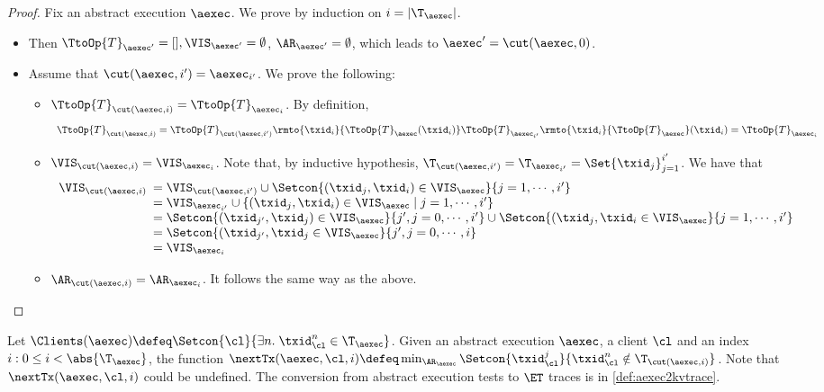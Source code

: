 \begin{proof}
Fix an abstract execution $\aexec$. We prove by induction on $i = \lvert \T_{\aexec} \rvert$.
\begin{itemize}
\item {} Then $\TtoOp{T}_{\aexec'} = [], \VIS_{\aexec'} = \emptyset$, 
$\AR_{\aexec'} = \emptyset$, which leads to $\aexec' = \cut(\aexec, 0)$. 
\item {} 
Assume that $\cut(\aexec, i') = \aexec_{i'}$. 
We prove the following: 
\begin{itemize}
\item $\TtoOp{T}_{\cut(\aexec, i)} = \TtoOp{T}_{\aexec_i}$. 
By definition, 
\[
    \begin{array}{l}
\TtoOp{T}_{\cut(\aexec,i)} = \TtoOp{T}_{\cut(\aexec, i')}\rmto{\txid_{i}}{\TtoOp{T}_{\aexec}(\txid_{i})} 
\TtoOp{T}_{\aexec_{i'}}\rmto{\txid_{i}}{\TtoOp{T}_{\aexec}}(\txid_{i}) = \TtoOp{T}_{\aexec_{i}}
\end{array}
\]
\item $\VIS_{\cut(\aexec, i)} = \VIS_{\aexec_{i}}$. 
Note that, by inductive hypothesis, $\T_{\cut(\aexec, i')} = \T_{\aexec_{i'}} = \Set{\txid_{j}}_{j=1}^{i'}$. 
We have that  
\[
\begin{array}{l}
    \VIS_{\cut(\aexec, i)}
    \begin{array}[t]{l}
    = \VIS_{\cut(\aexec, i')} \cup \Setcon{(\txid_j, \txid_{i}) \in \VIS_{\aexec} }{ j = 1,\cdots, i'} \\ 
    = \VIS_{\aexec_{i'}} \cup \{(\txid_{j}, \txid_{i}) \in \VIS_{\aexec} \mid j=1,\cdots, i'\} \\ 
    = \Setcon{(\txid_{j'}, \txid_{j}) \in \VIS_{\aexec} }{ j', j = 0,\cdots, i'} \cup \Setcon{(\txid_{j}, \txid_{i} \in \VIS_{\aexec} }{ j=1,\cdots, i'} \\
    = \Setcon{(\txid_{j'}, \txid_{j} \in \VIS_{\aexec}  }{ j',j = 0,\cdots, i} \\
    = \VIS_{\aexec_{i}}
    \end{array}
\end{array}
\]
\item $\AR_{\cut(\aexec, i)} = \AR_{\aexec_{i}}$. It follows the same way 
as the above. 
\end{itemize}
\end{itemize}
\end{proof}

Let $\Clients(\aexec) \defeq \Setcon{\cl }{ \exists n.\;\txid_{\cl}^{n} \in \T_{\aexec}}$.
Given an abstract execution $\aexec$, a client $\cl$ and an index $i : 0 \leq i < \abs{\T_\aexec}$,
the function $\nextTx(\aexec, \cl, i) \defeq \min_{\AR_{\aexec}} \Setcon{\txid_{\cl}^{j} }{ \txid_{\cl}^{n} \notin \T_{\cut(\aexec, i)}}$. 
Note that $\nextTx(\aexec, \cl, i)$ could be undefined. 
The conversion from abstract execution tests to \( \ET \) traces is in \cref{def:aexec2kvtrace}.

